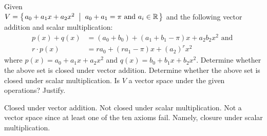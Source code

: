 
\begin{Exercise}[
name={},
title={}, 
difficulty=0,
origin={\cite{YL}}]
Given\\ $V=\mbox{$\left\{\hspace{0.1em}a_0+a_1x+a_2x^2\;\;\middle|\;\; a_0+a_1=\pi \text{ and } a_i\in\mathbb{R}\hspace{0.1em}\right\}$}$ and the following
vector addition and scalar multiplication:\\
\begin{align*}
p(x)+q(x)&=(a_0+b_0)+(a_1+b_1-\pi)x+a_2b_2x^2 \text{ and }\\
r\cdot p(x)&=ra_0+(ra_1-\pi)x+(a_2)^rx^2
\end{align*}
where $p(x)=a_0+a_1x+a_2x^2$ and $q(x)=b_0+b_1x+b_2x^2$.
\Question Determine whether the above set is closed under vector addition.
\Question Determine whether the above set is closed under scalar multiplication.
\Question Is $V$ a vector space under the given operations? Justify.
\end{Exercise}

\begin{Answer}
\Question Closed under vector addition.
\Question Not closed under scalar multiplication.
\Question Not a vector space since at least one of the ten axioms fail.  Namely, closure under scalar multiplication.
\end{Answer}
